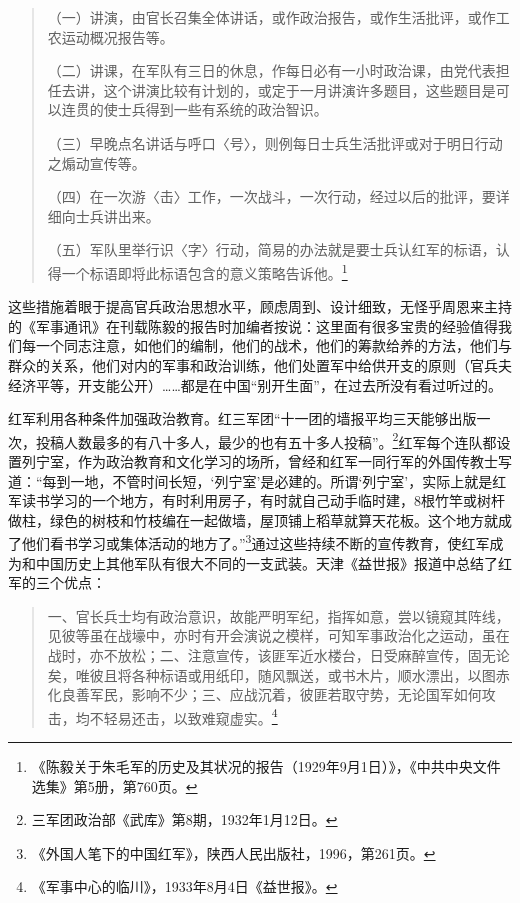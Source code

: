 \begin{quote}

（一）讲演，由官长召集全体讲话，或作政治报告，或作生活批评，或作工农运动概况报告等。

（二）讲课，在军队有三日的休息，作每日必有一小时政治课，由党代表担任去讲，这个讲演比较有计划的，或定于一月讲演许多题目，这些题目是可以连贯的使士兵得到一些有系统的政治智识。

（三）早晚点名讲话与呼口〈号〉，则例每日士兵生活批评或对于明日行动之煽动宣传等。

（四）在一次游〈击〉工作，一次战斗，一次行动，经过以后的批评，要详细向士兵讲出来。

（五）军队里举行识〈字〉行动，简易的办法就是要士兵认红军的标语，认得一个标语即将此标语包含的意义策略告诉他。\footnote{《陈毅关于朱毛军的历史及其状况的报告（1929年9月1日）》，《中共中央文件选集》第5册，第760页。}
\end{quote}


这些措施着眼于提高官兵政治思想水平，顾虑周到、设计细致，无怪乎周恩来主持的《军事通讯》在刊载陈毅的报告时加编者按说：这里面有很多宝贵的经验值得我们每一个同志注意，如他们的编制，他们的战术，他们的筹款给养的方法，他们与群众的关系，他们对内的军事和政治训练，他们处置军中给供开支的原则（官兵夫经济平等，开支能公开）……都是在中国“别开生面”，在过去所没有看过听过的。


红军利用各种条件加强政治教育。红三军团“十一团的墙报平均三天能够出版一次，投稿人数最多的有八十多人，最少的也有五十多人投稿”。\footnote{三军团政治部《武库》第8期，1932年1月12日。}红军每个连队都设置列宁室，作为政治教育和文化学习的场所，曾经和红军一同行军的外国传教士写道：“每到一地，不管时间长短，‘列宁室’是必建的。所谓‘列宁室’，实际上就是红军读书学习的一个地方，有时利用房子，有时就自己动手临时建，8根竹竿或树杆做柱，绿色的树枝和竹枝编在一起做墙，屋顶铺上稻草就算天花板。这个地方就成了他们看书学习或集体活动的地方了。”\footnote{《外国人笔下的中国红军》，陕西人民出版社，1996，第261页。}通过这些持续不断的宣传教育，使红军成为和中国历史上其他军队有很大不同的一支武装。天津《益世报》报道中总结了红军的三个优点：

\begin{quote}

一、官长兵士均有政治意识，故能严明军纪，指挥如意，尝以镜窥其阵线，见彼等虽在战壕中，亦时有开会演说之模样，可知军事政治化之运动，虽在战时，亦不放松；二、注意宣传，该匪军近水楼台，日受麻醉宣传，固无论矣，唯彼且将各种标语或用纸印，随风飘送，或书木片，顺水漂出，以图赤化良善军民，影响不少；三、应战沉着，彼匪若取守势，无论国军如何攻击，均不轻易还击，以致难窥虚实。\footnote{《军事中心的临川》，1933年8月4日《益世报》。}
\end{quote}


